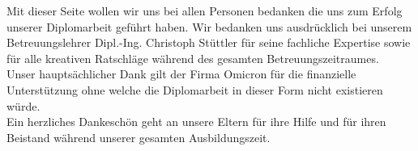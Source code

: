 Mit dieser Seite wollen wir uns bei allen Personen bedanken die uns zum Erfolg unserer Diplomarbeit geführt haben. 
Wir bedanken uns ausdrücklich bei unserem Betreuungslehrer Dipl.-Ing. Christoph Stüttler für seine fachliche Expertise sowie für alle kreativen Ratschläge während des 
gesamten Betreuungszeitraumes. \\

Unser hauptsächlicher Dank gilt der Firma Omicron für die finanzielle Unterstützung ohne welche die Diplomarbeit in dieser Form nicht existieren würde.\\

Ein herzliches Dankeschön geht an unsere Eltern für ihre Hilfe und für ihren Beistand während unserer gesamten Ausbildungszeit.